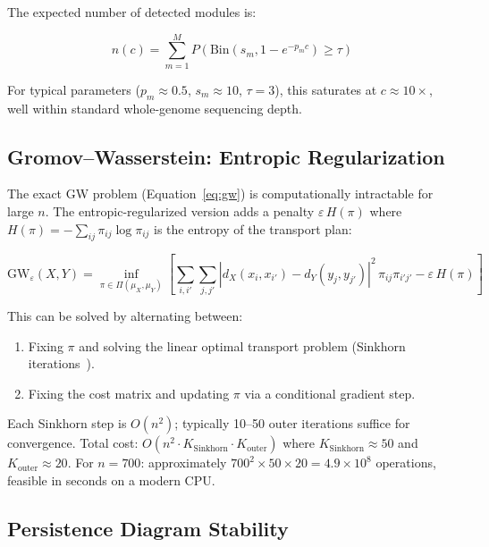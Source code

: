 \documentclass{../yalumba}
\begin{document}
The expected number of detected modules is:

\begin{equation}
  n(c) = \sum_{m=1}^{M} P\!\left(
    \mathrm{Bin}(s_m, 1 - e^{-p_m c}) \geq \tau
  \right)
  \label{eq:module_count}
\end{equation}

For typical parameters ($p_m \approx 0.5$, $s_m \approx 10$,
$\tau = 3$), this saturates at $c \approx 10\times$, well within
standard whole-genome sequencing depth.

\subsection{Gromov--Wasserstein: Entropic Regularization}
\label{sec:math:gw_entropic}

The exact GW problem (Equation~\ref{eq:gw}) is computationally
intractable for large $n$.  The entropic-regularized version
adds a penalty $\varepsilon \, H(\pi)$ where $H(\pi) = -\sum_{ij}
\pi_{ij} \log \pi_{ij}$ is the entropy of the transport plan:

\begin{equation}
  \mathrm{GW}_\varepsilon(X, Y) = \inf_{\pi \in \Pi(\mu_X, \mu_Y)}
  \left[
    \sum_{i,i'} \sum_{j,j'}
    |d_X(x_i, x_{i'}) - d_Y(y_j, y_{j'})|^2 \,
    \pi_{ij} \pi_{i'j'}
    - \varepsilon \, H(\pi)
  \right]
  \label{eq:gw_entropic}
\end{equation}

This can be solved by alternating between:
\begin{enumerate}
  \item Fixing $\pi$ and solving the linear optimal transport problem
    (Sinkhorn iterations~\cite{cuturi2013sinkhorn}).
  \item Fixing the cost matrix and updating $\pi$ via a conditional
    gradient step.
\end{enumerate}

Each Sinkhorn step is $O(n^2)$; typically 10--50 outer iterations
suffice for convergence.  Total cost: $O(n^2 \cdot K_{\mathrm{Sinkhorn}}
\cdot K_{\mathrm{outer}})$ where $K_{\mathrm{Sinkhorn}} \approx 50$ and
$K_{\mathrm{outer}} \approx 20$.  For $n = 700$: approximately
$700^2 \times 50 \times 20 = 4.9 \times 10^8$ operations, feasible in
seconds on a modern CPU.

\subsection{Persistence Diagram Stability}
\label{sec:math:stability}
\end{document}
